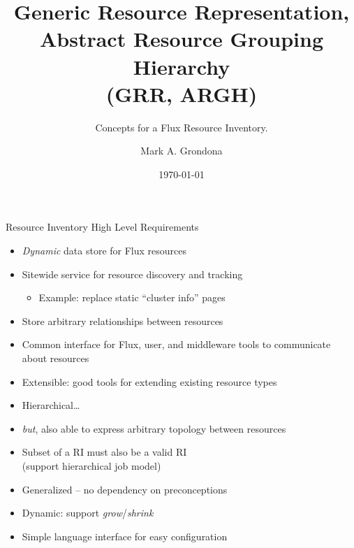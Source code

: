 \documentclass{beamer}
\begin{document}
\title[GRR, ARGH]{Generic Resource Representation,\\
                  Abstract Resource Grouping Hierarchy \\
                  (GRR, ARGH)}
\subtitle{Concepts for a Flux Resource Inventory.}
\author[Grondona]{Mark A. Grondona}
\date{\today}


\maketitle

\begin{frame}{Resource Inventory High Level Requirements}
\begin{itemize}
 \item {\em Dynamic} data store for Flux resources
 \item Sitewide service for resource discovery and tracking 
 \begin{itemize}
        \item Example: replace static ``cluster info'' pages
 \end{itemize}
 \item Store arbitrary relationships between resources
 \item Common interface for Flux, user, and middleware tools to communicate
        about resources
 \item Extensible: good tools for extending existing resource types
 \item Hierarchical\ldots
 \item {\em but}, also able to express arbitrary topology between resources
 \item Subset of a RI must also be a valid RI \\
       (support hierarchical job model)
 \item Generalized -- no dependency on preconceptions
 \item Dynamic: support {\em grow}/{\em shrink}
 \item Simple language interface for easy configuration
\end{itemize}
\end{frame}

\end{document}
